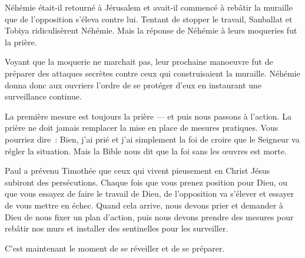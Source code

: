 


 Néhémie était-il retourné à Jérusalem
 et avait-il commencé à rebâtir la muraille que de l'opposition
 s'éleva contre lui.
 Tentant de stopper le travail, Sanballat et Tobiya ridiculisèrent Néhémie.
 Mais la réponse de Néhémie à leurs moqueries fut la prière.

Voyant que la moquerie ne marchait pas, leur prochaine manoeuvre
 fut de préparer des attaques secrètes contre ceux qui construisaient
 la muraille.
 Néhémie donna donc aux ouvriers l'ordre de se protéger d'eux en instaurant
 une surveillance continue.

La première mesure est toujours la prière --- et puis nous passons à l'action.
 La prière ne doit jamais remplacer la mise en place de mesures pratiques.
 Vous pourriez dire~:
 \og Bien, j'ai prié et j'ai simplement la foi de croire que le Seigneur
 va régler la situation. \fg{}
 Mais la Bible nous dit que la foi sans les œuvres est morte.


Paul a prévenu Timothée que ceux qui vivent pieusement en Christ Jésus
 subiront des persécutions.
 Chaque fois que vous prenez position pour Dieu,
 ou que vous essayez de faire le travail de Dieu,
 de l'opposition va s'élever et essayer de vous mettre en échec.
 Quand cela arrive, nous devons prier et demander à Dieu de nous fixer
 un plan d'action, puis nous devons prendre des mesures pour rebâtir
 nos murs et installer des sentinelles pour les surveiller.

C'est maintenant le moment de se réveiller et de se préparer. 


\dvrule






